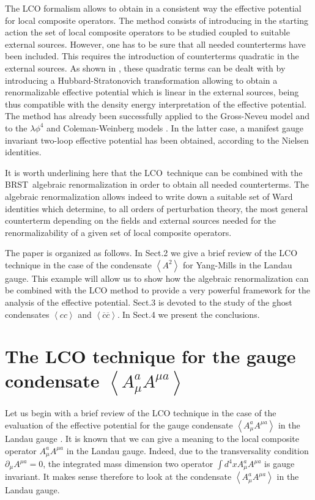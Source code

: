 \documentclass[a4paper,12pt]{article}
\begin{document}
The LCO formalism allows to obtain in a consistent way the effective
potential for local composite operators. The method consists of introducing
in the starting action the set of local composite operators to be studied
coupled to suitable external sources. However, one has to be sure that all
needed counterterms have been included. This requires the introduction of
counterterms quadratic in the external sources. As shown in \cite{v2,v3},
these quadratic terms can be dealt with by introducing a
Hubbard-Stratonovich transformation allowing to obtain a renormalizable
effective potential which is linear in the external sources, being thus
compatible with the density energy interpretation of the effective
potential. The method has already been successfully applied to the
Gross-Neveu model \cite{v2} and to the $\lambda \phi ^{4}$ and
Coleman-Weinberg models \cite{v3}. In the latter case, a manifest gauge
invariant two-loop effective potential has been obtained, according to the
Nielsen identities.

It is worth underlining here that the LCO\ technique can be combined with
the BRST\ algebraic renormalization \cite{book} in order to obtain all
needed counterterms. The algebraic renormalization allows indeed to write
down a suitable set of Ward identities which determine, to all orders of
perturbation theory, the most general counterterm depending on the fields
and external sources needed for the renormalizability of a given set of
local composite operators.

The paper is organized as follows. In Sect.2 we give a brief review of the
LCO technique in the case of the condensate $\left\langle A^{2}\right\rangle 
$ for Yang-Mills in the Landau gauge. This example will allow us to show how
the algebraic renormalization can be combined with the LCO method to provide
a very powerful framework for the analysis of the effective potential.
Sect.3 is devoted to the study of the ghost condensates $\left\langle
cc\right\rangle $ and $\left\langle \overline{c}\overline{c}\right\rangle .\;
$In Sect.4 we present the conclusions.

\section{The LCO technique for the gauge condensate $\left\langle A_{\mu
}^{a}A^{\mu a}\right\rangle \;$}

Let us begin with a brief review of the LCO technique \cite{v2,v3} in the
case of the evaluation of the effective potential for the gauge condensate $%
\left\langle A_{\mu }^{a}A^{\mu a}\right\rangle $ in the Landau gauge \cite
{v1}. It is known that we can give a meaning to the local composite operator 
$A_{\mu }^{a}A^{\mu a}$ in the Landau gauge. Indeed, due to the
transversality condition $\partial _{\mu }A^{\mu a}=0$, the integrated mass
dimension two operator $\int d^{4}xA_{\mu }^{a}A^{\mu a}$ is gauge
invariant. It makes sense therefore to look at the condensate $\left\langle
A_{\mu }^{a}A^{\mu a}\right\rangle $ in the Landau gauge.
\end{document}
